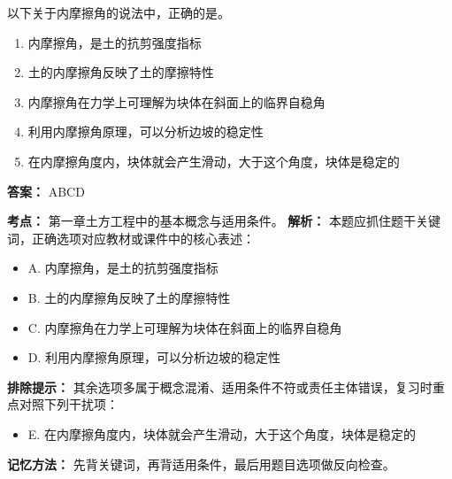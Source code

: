 \documentclass[UTF8,fontset=fandol,11pt]{ctexart}
\begin{document}
\begin{quizbox}[title={第 9 题}]
以下关于内摩擦角的说法中，正确的是。\\
\begin{enumerate}[label=\Alph*.]
\item 内摩擦角，是土的抗剪强度指标
\item 土的内摩擦角反映了土的摩擦特性
\item 内摩擦角在力学上可理解为块体在斜面上的临界自稳角
\item 利用内摩擦角原理，可以分析边坡的稳定性
\item 在内摩擦角度内，块体就会产生滑动，大于这个角度，块体是稳定的
\end{enumerate}
\textbf{答案：} ABCD
\vspace{0.25em}
\begin{answerbox}[title={考点解析}]
\textbf{考点：} 第一章土方工程中的基本概念与适用条件。
\textbf{解析：} 本题应抓住题干关键词，正确选项对应教材或课件中的核心表述：
\begin{itemize}
\item A. 内摩擦角，是土的抗剪强度指标
\item B. 土的内摩擦角反映了土的摩擦特性
\item C. 内摩擦角在力学上可理解为块体在斜面上的临界自稳角
\item D. 利用内摩擦角原理，可以分析边坡的稳定性
\end{itemize}
\textbf{排除提示：} 其余选项多属于概念混淆、适用条件不符或责任主体错误，复习时重点对照下列干扰项：
\begin{itemize}
\item E. 在内摩擦角度内，块体就会产生滑动，大于这个角度，块体是稳定的
\end{itemize}
\textbf{记忆方法：} 先背关键词，再背适用条件，最后用题目选项做反向检查。
\end{answerbox}
\end{quizbox}

\vspace{0.2em}
\end{document}
